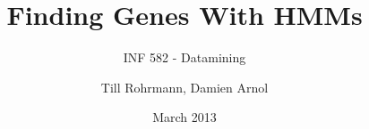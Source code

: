 \documentclass{beamer}
\title{Finding Genes With HMMs}
\subtitle{INF 582 - Datamining}
\author{Till Rohrmann, Damien Arnol}
\date{March 2013}
\begin{document}
\frame{
	\titlepage
}

%
%
%
\end{document}
